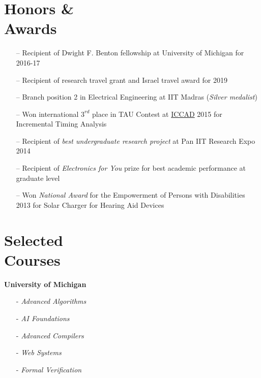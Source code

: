 \documentclass[margin,line,letter]{resume}
\begin{document}
\begin{resume}
\section{\mysidestyle Honors \& \\ Awards}
    \noindent
    \begin{itemize}[leftmargin=*]
    \item[--] Recipient of Dwight F. Benton fellowship at University of Michigan for 2016-17
    \item[--] Recipient of research travel grant and Israel travel award for 2019
    \item[--] Branch position 2 in Electrical Engineering at IIT Madras (\textit{Silver medalist})
    \item[--] Won international $3^{rd}$ place in TAU Contest at \href{https://iccad.com/}{ICCAD} 2015 for Incremental Timing Analysis
    \item[--] Recipient of \textit{best undergraduate research project} at Pan IIT Research Expo 2014
    \item[--] Recipient of \textit{Electronics for You} prize for best academic performance at graduate level
    \item[--] Won \textit{National Award} for the Empowerment of Persons with Disabilities 2013 for Solar Charger for Hearing Aid Devices
    \end{itemize}

\section{\mysidestyle Selected\\Courses}
    \vspace{-0.04cm}
    \textbf{University of Michigan} \\
    \vspace{-0.7cm}
        \begin{multicols}{3}
        \begin{itemize}
        \item[-] \emph{Advanced Algorithms}
        \item[-] \emph{AI Foundations}
        \item[-] \emph{Advanced Compilers}
        \item[-] \emph{Web Systems}
        \item[-] \emph{Formal Verification}
        \end{itemize}
        \end{multicols}
    

\end{resume}
\end{document}
